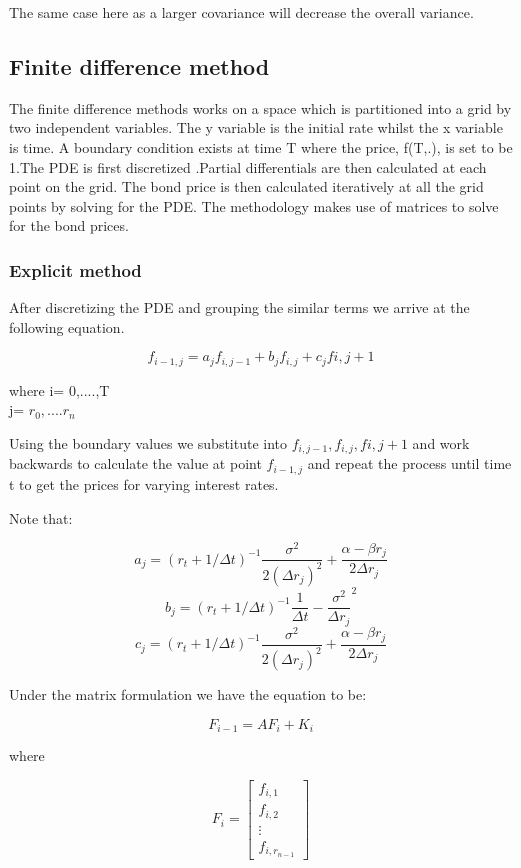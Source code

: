 \documentclass[12pt,a4paper]{article}
\begin{document}
The same case here as a larger covariance will decrease the overall variance. 








\subsection{Finite difference method}

The finite difference methods works on a space which is partitioned into a grid by two independent variables. The y variable is the initial rate whilst the x variable is time. A boundary condition exists at time T where the price, f(T,.), is set to be 1.The PDE is first discretized .Partial differentials are then calculated at each point on the grid. The bond price is then calculated iteratively at all the grid points by solving for the PDE. The methodology makes use of matrices to solve for the bond prices.  


\subsubsection{Explicit method}

After discretizing the PDE and grouping the similar terms we arrive at the following equation.  

$$f_{i-1,j}=a_{j}f_{i,j-1}+b_{j}f_{i,j}+c_{j}f{i,j+1}$$ 

where i= 0,....,T \\
j= $r_0, ....r_n$

Using the boundary values we substitute into $f_{i,j-1}, f_{i,j}, f{i,j+1}$ and work backwards to calculate the value at point $f_{i-1,j}$ and repeat the process until time t to get the prices for varying interest rates. 

Note that:       


$$a_{j}=(r_t+1/\Delta t)^{-1}\frac{\sigma^{2}}{2(\Delta r_j)^{2}}+\frac{\alpha-\beta r_j}{2\Delta r_j}$$
$$b_{j}=(r_t+1/\Delta t)^{-1}\frac{1}{\Delta t}-\frac{\sigma^2}{\Delta r_j}^{2}$$
$$c_{j}=(r_t+1/\Delta t)^{-1}\frac{\sigma^{2}}{2(\Delta r_j)^{2}}+\frac{\alpha-\beta r_j}{2\Delta r_j}$$

Under the matrix formulation we have the equation to be:

$$F_{i-1}=AF_{i}+K_{i}$$

where

$$F_{i}= \begin{bmatrix}
f_{i,1} \\
f_{i,2} \\
\vdots \\
f_{i,r_{n-1}}
\end{bmatrix}
$$
\end{document}
